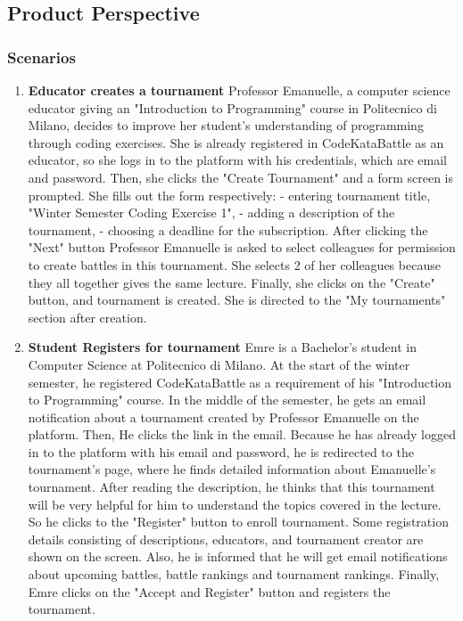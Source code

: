 \subsection{Product Perspective}
\subsubsection{Scenarios}
\begin{enumerate}
    \item \textbf{Educator creates a tournament} \newline Professor Emanuelle, a computer science educator giving an "Introduction to Programming" course in Politecnico di Milano, decides to improve her student's understanding of programming through coding exercises. She is already registered in CodeKataBattle as an educator, so she logs in to the platform with his credentials, which are email and password. Then, she clicks the "Create Tournament" and a form screen is prompted. She fills out the form respectively: \newline
    - entering tournament title, "Winter Semester Coding Exercise 1", \newline
    - adding a description of the tournament, \newline
    - choosing a deadline for the subscription. After clicking the "Next" button\newline
    Professor Emanuelle is asked to select colleagues for permission to create battles in this tournament. She selects 2 of her colleagues because they all together gives the same lecture. Finally, she clicks on the "Create" button, and tournament is created. She is directed to the "My tournaments" section after creation.
    \item \textbf{Student Registers for tournament} \newline Emre is a Bachelor's student in Computer Science at Politecnico di Milano. At the start of the winter semester, he registered CodeKataBattle as a requirement of his "Introduction to Programming" course. In the middle of the semester, he gets an email notification about a tournament created by Professor Emanuelle on the platform. Then, He clicks the link in the email. Because he has already logged in to the platform with his email and password, he is redirected to the tournament's page, where he finds detailed information about Emanuelle's tournament. After reading the description, he thinks that this tournament will be very helpful for him to understand the topics covered in the lecture. So he clicks to the "Register" button to enroll tournament. Some registration details consisting of descriptions, educators, and tournament creator are shown on the screen. Also, he is informed that he will get email notifications about upcoming battles, battle rankings and tournament rankings. Finally, Emre clicks on the "Accept and Register" button and registers the tournament.

\end{enumerate}
